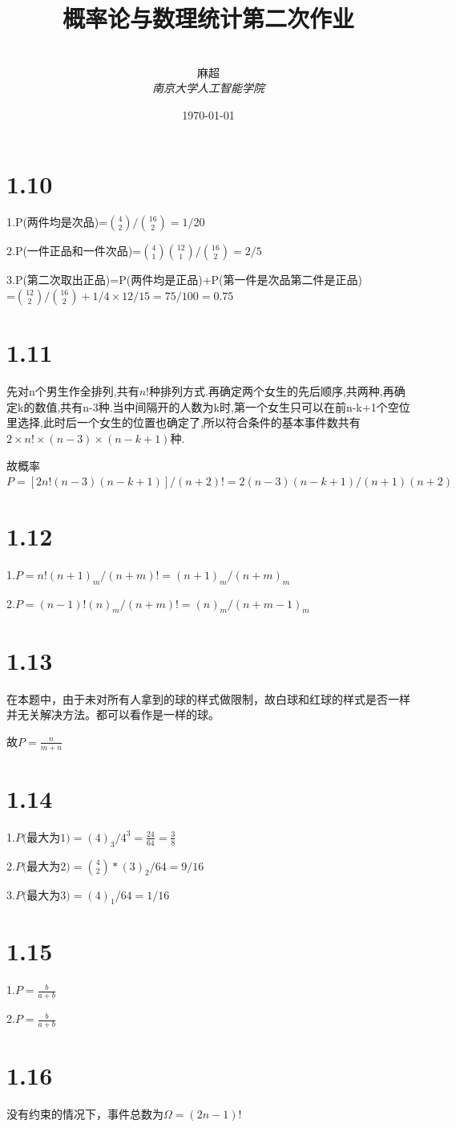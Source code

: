 \documentclass[12pt,a4paper]{ctexart}
\title{\textbf{概率论与数理统计第二次作业}}
\author{
\\
\Large{麻超 \quad 201300066}
\\[6pt]
{ \large \textit{南京大学人工智能学院}}\\[2pt]
}
\date{\today}
\begin{document}
\maketitle
\setcounter{page}{1}

\section{1.10}
1.P(两件均是次品)=$\binom{4}{2}/\binom{16}{2}=1/20$

2.P(一件正品和一件次品)=$\binom{4}{1}\binom{12}{1}/\binom{16}{2}=2/5$

3.P(第二次取出正品)=P(两件均是正品)+P(第一件是次品第二件是正品)\\=$\binom{12}{2}/\binom{16}{2}+1/4\times 12/15=75/100=0.75$
\section{1.11}
先对n个男生作全排列,共有$n!$种排列方式.再确定两个女生的先后顺序,共两种,再确定k的数值,共有n-3种.当中间隔开的人数为k时,第一个女生只可以在前n-k+1个空位里选择,此时后一个女生的位置也确定了,所以符合条件的基本事件数共有$2\times n! \times (n-3)\times (n-k+1)$种.

故概率$P=[2n!(n-3)(n-k+1)]/(n+2)! =2(n-3)(n-k+1)/(n+1)(n+2)$
\section{1.12}
1.$P=n!(n+1)_m/(n+m)! =(n+1)_m/(n+m)_m$

2.$P=(n-1)!(n)_m/(n+m)! =(n)_m/(n+m-1)_m$
\section{1.13}
在本题中，由于未对所有人拿到的球的样式做限制，故白球和红球的样式是否一样并无关解决方法。都可以看作是一样的球。

故$P=\frac{n}{m+n}$
\section{1.14}
1.$P($最大为$1)=(4)_3/4^3=\frac{24}{64}  = \frac{3}{8}$

2.$P($最大为$2)=\binom{4}{2}*(3)_2/64=9/16$

3.$P($最大为$3)=(4)_1/64=1/16$
\section{1.15}
1.$P=\frac{b}{a+b}$

2.$P=\frac{b}{a+b}$
\section{1.16}
没有约束的情况下，事件总数为$\Omega=(2n-1)!$
\end{document}
